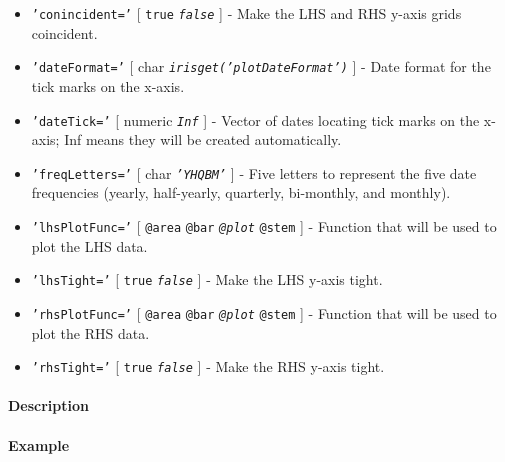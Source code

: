 \begin{itemize}
\item
  \texttt{'conincident='} {[} \texttt{true} \textbar{}
  \emph{\texttt{false}} {]} - Make the LHS and RHS y-axis grids
  coincident.
\item
  \texttt{'dateFormat='} {[} char \textbar{}
  \emph{\texttt{irisget('plotDateFormat')}} {]} - Date format for the
  tick marks on the x-axis.
\item
  \texttt{'dateTick='} {[} numeric \textbar{} \emph{\texttt{Inf}} {]} -
  Vector of dates locating tick marks on the x-axis; Inf means they will
  be created automatically.
\item
  \texttt{'freqLetters='} {[} char \textbar{} \emph{\texttt{'YHQBM'}}
  {]} - Five letters to represent the five date frequencies (yearly,
  half-yearly, quarterly, bi-monthly, and monthly).
\item
  \texttt{'lhsPlotFunc='} {[} \texttt{@area} \textbar{} \texttt{@bar}
  \textbar{} \emph{\texttt{@plot}} \textbar{} \texttt{@stem} {]} -
  Function that will be used to plot the LHS data.
\item
  \texttt{'lhsTight='} {[} \texttt{true} \textbar{}
  \emph{\texttt{false}} {]} - Make the LHS y-axis tight.
\item
  \texttt{'rhsPlotFunc='} {[} \texttt{@area} \textbar{} \texttt{@bar}
  \textbar{} \emph{\texttt{@plot}} \textbar{} \texttt{@stem} {]} -
  Function that will be used to plot the RHS data.
\item
  \texttt{'rhsTight='} {[} \texttt{true} \textbar{}
  \emph{\texttt{false}} {]} - Make the RHS y-axis tight.
\end{itemize}

\paragraph{Description}

\paragraph{Example}


